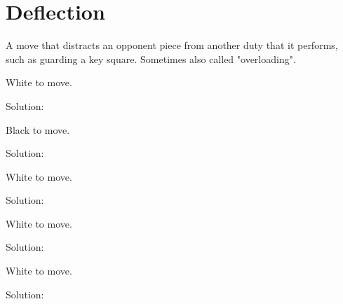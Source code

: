 \documentclass{book}
\begin{document}
\section{Deflection}
A move that distracts an opponent piece from another duty that it performs, such as guarding a key square. Sometimes also called "overloading".\begin{multicols}{2} 
\begin{samepage} 
\newgame 


 
\showboard
 
 White to move. 
 
Solution: 
 
\end{samepage}\begin{samepage} 
\newgame 


 
\showboard
 
 Black to move. 
 
Solution: 
 
\end{samepage}\begin{samepage} 
\newgame 


 
\showboard
 
 White to move. 
 
Solution: 
 
\end{samepage}\begin{samepage} 
\newgame 


 
\showboard
 
 White to move. 
 
Solution: 
 
\end{samepage}\begin{samepage} 
\newgame 


 
\showboard
 
 White to move. 
 
Solution: 
 
\end{samepage}\end{multicols} 
\newpage 
\end{document}
